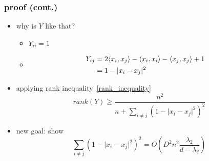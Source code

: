\documentclass{beamer}
\DeclarePairedDelimiter\ev{\langle}{\rangle}%
\begin{document}
\begin{frame}
    \frametitle{proof (cont.)}
    \begin{itemize}
        \item why is \(Y\) like that?
    
        
    
        \begin{itemize}
            \item \(Y_{ii} = 1\)
            \item \begin{equation}\begin{split}
                    Y_{ij} &= 2\ev{x_i,x_j} - \ev{x_i,x_i} - \ev{x_j,x_j} + 1 \\
                    &= 1-\lvert x_i-x_j\rvert^2
            \end{split}
            \end{equation}
        \end{itemize} 
        \item applying rank inequality~\ref{rank_inequality}\begin{equation}
            rank(Y)\geq \frac{n^2}{n+\sum_{i\neq j}^{}\left( 1-\lvert x_i-x_j\rvert^2 \right)^2}
        \end{equation}
        \item new goal: show
        \begin{equation}\label{new_goal_1}
            \sum_{i\neq j}^{}\left( 1-\lvert x_i-x_j\rvert^2 \right)^2 = O(D^2n^2\frac{\lambda_2}{d-\lambda_2})
        \end{equation}
    \end{itemize}
\end{frame}
\end{document}
